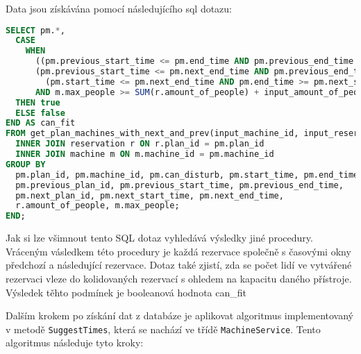 Data jsou získávána pomocí následujícího sql dotazu:
\begin{lstlisting}[language=SQL]
SELECT pm.*,
  CASE
    WHEN
      ((pm.previous_start_time <= pm.end_time AND pm.previous_end_time >= pm.start_time) OR
      (pm.previous_start_time <= pm.next_end_time AND pm.previous_end_time >= pm.next_start_time) OR
        (pm.start_time <= pm.next_end_time AND pm.end_time >= pm.next_start_time))
      AND m.max_people >= SUM(r.amount_of_people) + input_amount_of_people
  THEN true
  ELSE false
END AS can_fit
FROM get_plan_machines_with_next_and_prev(input_machine_id, input_reservation_date) pm
  INNER JOIN reservation r ON r.plan_id = pm.plan_id
  INNER JOIN machine m ON m.machine_id = pm.machine_id
GROUP BY
  pm.plan_id, pm.machine_id, pm.can_disturb, pm.start_time, pm.end_time,
  pm.previous_plan_id, pm.previous_start_time, pm.previous_end_time,
  pm.next_plan_id, pm.next_start_time, pm.next_end_time,
  r.amount_of_people, m.max_people;
END;
\end{lstlisting}
Jak si lze všimnout tento SQL dotaz vyhledává výsledky jiné procedury. Vráceným vásledkem této procedury je každá rezervace společně s časovými okny předchozí a následující rezervace.
Dotaz také zjistí, zda se počet lidí ve vytvářené rezervaci vleze do kolidovaných rezervací s ohledem na kapacitu daného přístroje. Výsledek těhto podmínek je booleanová hodnota can\_fit

Dalším krokem po získání dat z databáze je aplikovat algoritmus implementovaný v metodě \texttt{SuggestTimes}, která se nachází ve třídě \texttt{MachineService}. Tento algoritmus následuje tyto kroky:


